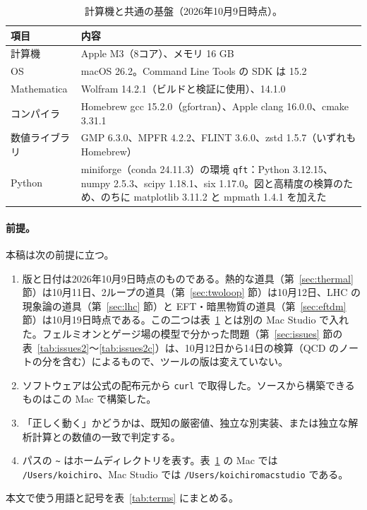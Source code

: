 \documentclass[a4paper,10pt]{ltjsarticle}
\begin{document}
\begin{table}[tbp]
\centering\small
\caption{計算機と共通の基盤（2026年10月9日時点）。}
\label{tab:machine}
\begin{tabularx}{\linewidth}{>{\raggedright\arraybackslash}p{4.0cm}X}
\toprule
\textbf{項目} & \textbf{内容} \\
\midrule
計算機 & Apple M3（8コア）、メモリ 16 GB \\
OS & macOS 26.2。Command Line Tools の SDK は 15.2 \\
Mathematica & Wolfram 14.2.1（ビルドと検証に使用）、14.1.0 \\
コンパイラ & Homebrew gcc 15.2.0（gfortran）、Apple clang 16.0.0、cmake 3.31.1 \\
数値ライブラリ & GMP 6.3.0、MPFR 4.2.2、FLINT 3.6.0、zstd 1.5.7（いずれも Homebrew） \\
Python & miniforge（conda 24.11.3）の環境 \texttt{qft}：Python 3.12.15、numpy 2.5.3、scipy 1.18.1、six 1.17.0。図と高精度の検算のため、のちに matplotlib 3.11.2 と mpmath 1.4.1 を加えた \\
\bottomrule
\end{tabularx}
\end{table}

\paragraph{前提。}本稿は次の前提に立つ。
\begin{enumerate}
\item 版と日付は2026年10月9日時点のものである。熱的な道具（第~\ref{sec:thermal} 節）は10月11日、2ループの道具（第~\ref{sec:twoloop} 節）は10月12日、LHC の現象論の道具（第~\ref{sec:lhc} 節）と EFT・暗黒物質の道具（第~\ref{sec:eftdm} 節）は10月19日時点である。この二つは表~\ref{tab:machine} とは別の Mac Studio で入れた。フェルミオンとゲージ場の模型で分かった問題（第~\ref{sec:issues} 節の表~\ref{tab:issues2}〜\ref{tab:issues2c}）は、10月12日から14日の検算（QCD のノートの分を含む）によるもので、ツールの版は変えていない。
\item ソフトウェアは公式の配布元から \texttt{curl} で取得した。ソースから構築できるものはこの Mac で構築した。
\item 「正しく動く」かどうかは、既知の厳密値、独立な別実装、または独立な解析計算との数値の一致で判定する。
\item パスの \texttt{\textasciitilde} はホームディレクトリを表す。表~\ref{tab:machine} の Mac では \nolinkurl{/Users/koichiro}、Mac Studio では \nolinkurl{/Users/koichiromacstudio} である。
\end{enumerate}
本文で使う用語と記号を表~\ref{tab:terms} にまとめる。
\end{document}
